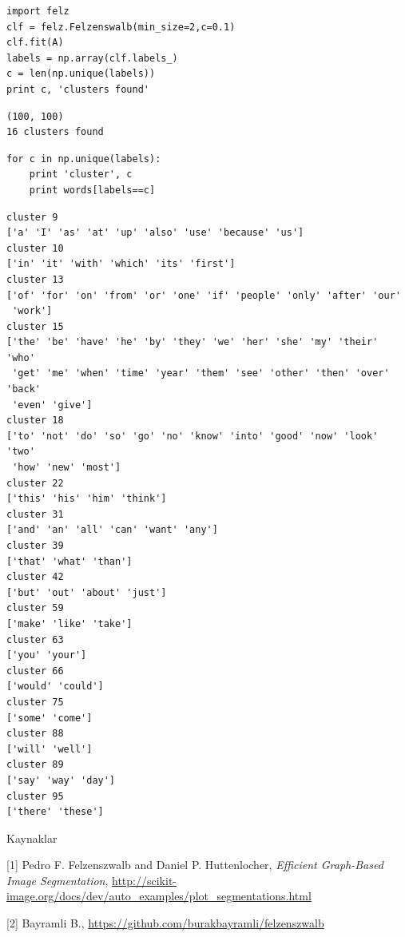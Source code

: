 \documentclass[12pt,fleqn]{article}\usepackage{../common}
\begin{document}
\begin{verbatim}
import felz
clf = felz.Felzenswalb(min_size=2,c=0.1)
clf.fit(A)
labels = np.array(clf.labels_)
c = len(np.unique(labels))
print c, 'clusters found'
\end{verbatim}

\begin{verbatim}
(100, 100)
16 clusters found
\end{verbatim}

\begin{verbatim}
for c in np.unique(labels):
    print 'cluster', c
    print words[labels==c]
\end{verbatim}

\begin{verbatim}
cluster 9
['a' 'I' 'as' 'at' 'up' 'also' 'use' 'because' 'us']
cluster 10
['in' 'it' 'with' 'which' 'its' 'first']
cluster 13
['of' 'for' 'on' 'from' 'or' 'one' 'if' 'people' 'only' 'after' 'our'
 'work']
cluster 15
['the' 'be' 'have' 'he' 'by' 'they' 'we' 'her' 'she' 'my' 'their' 'who'
 'get' 'me' 'when' 'time' 'year' 'them' 'see' 'other' 'then' 'over' 'back'
 'even' 'give']
cluster 18
['to' 'not' 'do' 'so' 'go' 'no' 'know' 'into' 'good' 'now' 'look' 'two'
 'how' 'new' 'most']
cluster 22
['this' 'his' 'him' 'think']
cluster 31
['and' 'an' 'all' 'can' 'want' 'any']
cluster 39
['that' 'what' 'than']
cluster 42
['but' 'out' 'about' 'just']
cluster 59
['make' 'like' 'take']
cluster 63
['you' 'your']
cluster 66
['would' 'could']
cluster 75
['some' 'come']
cluster 88
['will' 'well']
cluster 89
['say' 'way' 'day']
cluster 95
['there' 'these']
\end{verbatim}






Kaynaklar

[1] Pedro F. Felzenszwalb and Daniel P. Huttenlocher, {\em Efficient
  Graph-Based Image Segmentation},
\url{http://scikit-image.org/docs/dev/auto_examples/plot_segmentations.html}

[2] Bayramli B., \url{https://github.com/burakbayramli/felzenszwalb}
\end{document}

